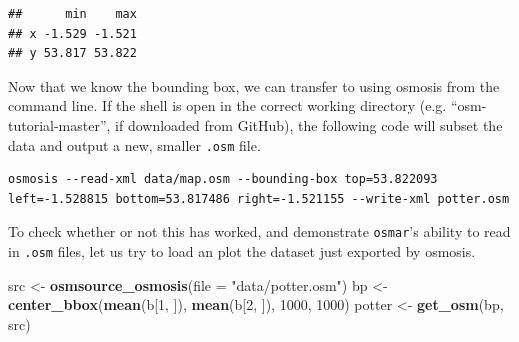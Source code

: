 \documentclass[]{article}
\newenvironment{Shaded}{}{}
\newcommand{\KeywordTok}[1]{\textcolor[rgb]{0.00,0.44,0.13}{\textbf{{#1}}}}
\newcommand{\DataTypeTok}[1]{\textcolor[rgb]{0.56,0.13,0.00}{{#1}}}
\newcommand{\DecValTok}[1]{\textcolor[rgb]{0.25,0.63,0.44}{{#1}}}
\newcommand{\FloatTok}[1]{\textcolor[rgb]{0.25,0.63,0.44}{{#1}}}
\newcommand{\StringTok}[1]{\textcolor[rgb]{0.25,0.44,0.63}{{#1}}}
\newcommand{\CommentTok}[1]{\textcolor[rgb]{0.38,0.63,0.69}{\textit{{#1}}}}
\newcommand{\NormalTok}[1]{{#1}}
\begin{document}
\begin{Shaded}
\end{Shaded}

\begin{verbatim}
##      min    max
## x -1.529 -1.521
## y 53.817 53.822
\end{verbatim}

Now that we know the bounding box, we can transfer to using osmosis from
the command line. If the shell is open in the correct working directory
(e.g. ``osm-tutorial-master'', if downloaded from GitHub), the following
code will subset the data and output a new, smaller \texttt{.osm} file.

\begin{verbatim}
osmosis --read-xml data/map.osm --bounding-box top=53.822093 left=-1.528815 bottom=53.817486 right=-1.521155 --write-xml potter.osm
\end{verbatim}

To check whether or not this has worked, and demonstrate
\texttt{osmar}'s ability to read in \texttt{.osm} files, let us try to
load an plot the dataset just exported by osmosis.

\begin{Shaded}
\begin{Highlighting}[]
\NormalTok{src <- }\KeywordTok{osmsource_osmosis}\NormalTok{(}\DataTypeTok{file =} \StringTok{"data/potter.osm"}\NormalTok{)}
\NormalTok{bp <- }\KeywordTok{center_bbox}\NormalTok{(}\KeywordTok{mean}\NormalTok{(b[}\DecValTok{1}\NormalTok{, ]), }\KeywordTok{mean}\NormalTok{(b[}\DecValTok{2}\NormalTok{, ]), }\DecValTok{1000}\NormalTok{, }\DecValTok{1000}\NormalTok{)}
\NormalTok{potter <- }\KeywordTok{get_osm}\NormalTok{(bp, src)}
\end{Highlighting}
\end{Shaded}
\end{document}
